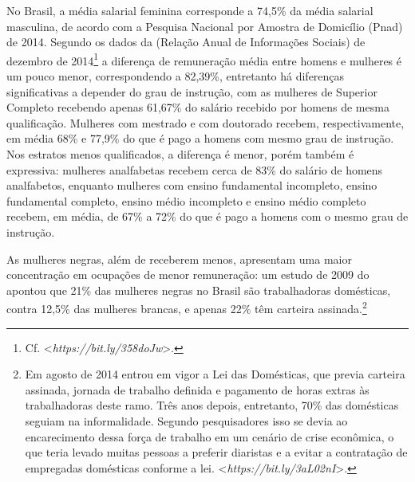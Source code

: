 No Brasil, a média salarial feminina corresponde a 74,5\% da média
salarial masculina, de acordo com a Pesquisa Nacional por Amostra de
Domicílio (Pnad) de 2014. Segundo os dados da  (Relação Anual de
Informações Sociais) de dezembro de 2014\footnote{Cf.
  \textless{}\emph{https://bit.ly/358doJw}\textgreater{}.}
a diferença de remuneração média entre homens e mulheres é um pouco
menor, correspondendo a 82,39\%, entretanto há diferenças significativas
a depender do grau de instrução, com as mulheres de Superior Completo
recebendo apenas 61,67\% do salário recebido por homens de mesma
qualificação. Mulheres com mestrado e com doutorado recebem,
respectivamente, em média 68\% e 77,9\% do que é pago a homens com mesmo
grau de instrução. Nos estratos menos qualificados, a diferença é menor,
porém também é expressiva: mulheres analfabetas recebem cerca de 83\% do
salário de homens analfabetos, enquanto mulheres com ensino fundamental
incompleto, ensino fundamental completo, ensino médio incompleto e
ensino médio completo recebem, em média, de 67\% a 72\% do que é pago a
homens com o mesmo grau de instrução.

As mulheres negras, além de receberem menos, apresentam uma maior
concentração em ocupações de menor remuneração: um estudo de 2009 do
 apontou que 21\% das mulheres negras no Brasil são trabalhadoras
domésticas, contra 12,5\% das mulheres brancas, e apenas 22\% têm
carteira assinada.\footnote{Em agosto de 2014 entrou em vigor a Lei das
  Domésticas, que previa carteira assinada, jornada de trabalho definida
  e pagamento de horas extras às trabalhadoras deste ramo. Três anos
  depois, entretanto, 70\% das domésticas seguiam na informalidade.
  Segundo pesquisadores isso se devia ao encarecimento dessa força de
  trabalho em um cenário de crise econômica, o que teria levado muitas
  pessoas a preferir diaristas e a evitar a contratação de empregadas
  domésticas conforme a lei.
  \textless{}\emph{https://bit.ly/3aL02nI}\textgreater{}.}

